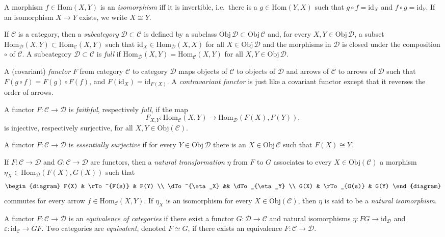\documentclass[11pt]{article}
\theoremstyle{definition}
\theoremstyle{definition}
\theoremstyle{remark}
\newcommand{\Obj}{\mathrm{Obj}}
\newcommand{\ve}{\varepsilon}
\def\2#1{{\mathcal #1}}
\newcommand{\Hom}{\mathrm{Hom}}
\newcommand{\rarr}{\rightarrow}
\def\id{\mathrm{id}}
\begin{document}
\bdefin {} A morphism $f\in \Hom (X,Y)$ is an
\emph{isomorphism} iff it is invertible, i.e.\ there is a $g\in \Hom
(Y,X)$ such that $g\circ f=\id_{X}$ and $f\circ g=\id_Y$. If an
isomorphism $X\rarr Y$ exists, we write $X\cong Y$.  \edefin

\bdefin {} If $\2C$ is a category, then a
\emph{subcategory} $\2D\subset\2C$ is defined by a subclass
$\Obj\,\2D\subset\Obj\,\2C$ and, for every $X,Y\in\Obj\,\2D$, a subset
$\Hom_\2D(X,Y)\subset\Hom_\2C(X,Y)$ such that $\id_X\in\Hom_\2D(X,X)$
for all $X\in\Obj\,\2D$ and the morphisms in $\2D$ is closed under the
composition $\circ$ of $\2C$. A subcategory $\2D\subset\2C$ is
\emph{full} if $\Hom_\2D(X,Y)=\Hom_\2C(X,Y)$ for all
$X,Y\in\Obj\,\2D$.  \edefin

\bdefin {}
A (covariant) \emph{functor} $F$ from category $\2C$ to category $\2D$
  maps objects of $\2C$ to objects of $\2D$ and arrows of $\2C$ to arrows of $\2D$
  such that $F(g\circ f)=F(g)\circ F(f)$, and $F(\id _X)=\id _{F(X)}$.  A
  \emph{contravariant functor} is just like a covariant functor except that it
  reverses the order of arrows. \edefin

  \bdefin {}  A functor
  $F:\2C\to \2D$ is \emph{faithful}, respectively \emph{full}, if the
  map
\[ F_{X,Y}:\Hom _{\2C}(X,Y)\to \Hom _{\2D}(F(X),F(Y)), \]
is injective, respectively surjective, for all $X,Y\in \Obj (\2C)$.  
\edefin

\bdefin {}
A functor $F:\2C\to \2D$ is \emph{essentially surjective} if for every $Y\in\Obj\,\2D$ there
is an $X\in\Obj\,\2C$ such that $F(X)\cong Y$.
\edefin

\bdefin {} \label{nat-trans}
If $F:\2C\to \2D$ and $G:\2C\to \2D$ are functors, then a \emph{natural
    transformation} $\eta$ from $F$ to $G$ associates to every $X\in\Obj (\2C )$ a
  morphism $\eta _X \in \Hom _{\2D }(F(X),G(X))$ such that 
\[ \begin{diagram} F(X) & \rTo^{F(s)} & F(Y) \\
   \dTo^{\eta_X} && \dTo_{\eta_Y} \\
   G(X) & \rTo_{G(s)} & G(Y) \end{diagram} \]
commutes for every arrow $f\in \Hom_{\2C }(X,Y)$.  If $\eta _X$ is an isomorphism
for every $X\in \Obj (\2C )$, then $\eta$ is said
  to be a \emph{natural isomorphism}. 
\edefin

\bdefin {} 
A functor $F:\2C\to \2D$ is an \emph{equivalence of categories} if there exist a functor
$G:\2D\to \2C$ and natural isomorphisms $\eta:FG\to \id _{\2D}$ and $\ve :\id _{\2C}\to GF$. Two
categories are \emph{equivalent}, denoted $F\simeq G$, if there exists an equivalence
$F:\2C\rarr\2D$. 
\edefin
\end{document}
